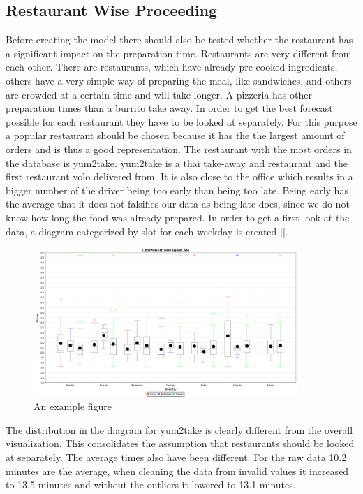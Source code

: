 \subsection{Restaurant Wise Proceeding}\label{subsection:Restaurant Wise Proceeding}
Before creating the model there should also be tested whether the restaurant has a significant impact on the preparation time. Restaurants are very different from each other. There are restaurants, which have already pre-cooked ingredients, others have a very simple way of preparing the meal, like sandwiches, and others are crowded at a certain time and will take longer. A pizzeria has other preparation times than a burrito take away. In order to get the best forecast possible for each restaurant they have to be looked at separately. For this purpose a popular restaurant should be chosen because it has the the largest amount of orders and is thus a good representation.
The restaurant with the most orders in the database is yum2take. yum2take is a thai take-away and restaurant and the first restaurant volo delivered from. It is also close to the office which results in a bigger number of the driver being too early than being too late. Being early has the average that it does not falsifies our data as being late does, since we do not know how long the food was already prepared. In order to get a first look at the data, a diagram categorized by slot for each weekday is created [].
\begin{figure}[h]
\begin{center}
\includegraphics[width=10cm]{images/1_boxWhisker_weekdaySlot_686.png}
\caption{An example figure}
\label{fig:example}
\end{center}
\end{figure}
The distribution in the diagram for yum2take is clearly different from the overall visualization. This consolidates the assumption that restaurants should be looked at separately. The average times also have been different. For the raw data 10.2 minutes are the average, when cleaning the data from invalid values it increased to 13.5 minutes and without the outliers it lowered to 13.1 minutes.
